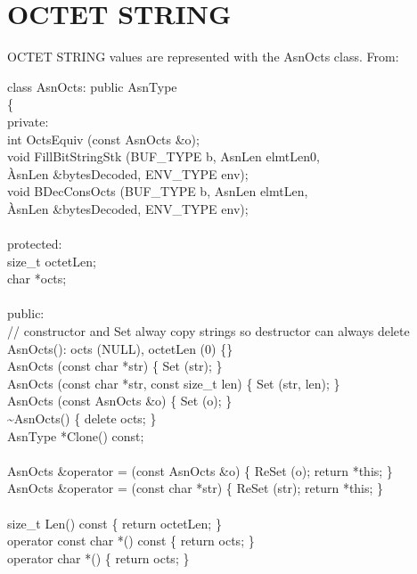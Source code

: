 \section{\label{octets-C++-section}OCTET STRING}
OCTET STRING values are represented with the {\C AsnOcts} class.
From:
\begin{Ccode}
class AsnOcts: public AsnType\\
\{\\
private:\+\\
  int				\>\>OctsEquiv (const AsnOcts \&o);\\
  void				\>\>FillBitStringStk (BUF\_TYPE b, AsnLen elmtLen0,\\
					\`AsnLen \&bytesDecoded, ENV\_TYPE env);\\
  void				\>\>BDecConsOcts (BUF\_TYPE b, AsnLen elmtLen,\\
					\`AsnLen \&bytesDecoded, ENV\_TYPE env);\\
\\
\<protected:\\
  size\_t			\>\>octetLen;\\
  char				\>\>*octs;\\
\\
\<public:\\
  // constructor and Set alway copy strings so destructor can always delete\\
				\>\>AsnOcts(): octs (NULL), octetLen (0) \{\}\\
				\>\>AsnOcts (const char *str)  \{ Set (str); \}\\
				\>\>AsnOcts (const char *str, const size\_t len) \{ Set (str, len); \}\\
				\>\>AsnOcts (const AsnOcts \&o) \{ Set (o); \}\\
				\>\>\~{}AsnOcts() \{ delete octs; \}\\
  AsnType			\>\>*Clone() const;\\
\\
  AsnOcts			\>\>\&operator = (const AsnOcts \&o) \{ ReSet (o); return *this; \}\\
  AsnOcts			\>\>\&operator = (const char *str) \{ ReSet (str); return *this; \}\\
\\
  size\_t			\>\>Len() const \{ return octetLen; \}\\
				\>\>operator const char *() const \{ return octs; \}\\
				\>\>operator char *() \{ return octs; \}\\

\end{Ccode}
